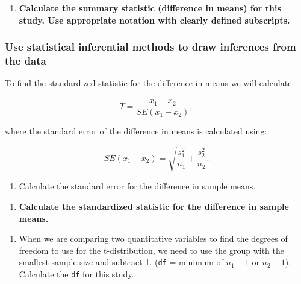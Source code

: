 \documentclass[
]{report}
\providecommand{\tightlist}{%
  \setlength{\itemsep}{0pt}\setlength{\parskip}{0pt}}
\begin{document}
\begin{enumerate}
\def\labelenumi{\arabic{enumi}.}
\setcounter{enumi}{5}
\tightlist
\item
  \textbf{Calculate the summary statistic (difference in means) for this study. Use appropriate notation with clearly defined subscripts.}
\end{enumerate}

\vspace{1in}

\hypertarget{use-statistical-inferential-methods-to-draw-inferences-from-the-data-4}{%
\subsubsection*{Use statistical inferential methods to draw inferences from the data}\label{use-statistical-inferential-methods-to-draw-inferences-from-the-data-4}}

To find the standardized statistic for the difference in means we will calculate:

\[T = \frac{\bar{x}_1-\bar{x}_2}{SE(\bar{x}_1-\bar{x}_2)},\]

where the standard error of the difference in means is calculated using:

\[SE(\bar{x}_1 -\bar{x}_2)=\sqrt{\frac{s_1^2}{n_1}+\frac{s_2^2}{n_2}}.\]

\begin{enumerate}
\def\labelenumi{\arabic{enumi}.}
\setcounter{enumi}{6}
\tightlist
\item
  Calculate the standard error for the difference in sample means.
\end{enumerate}

\vspace{0.5in}

\begin{enumerate}
\def\labelenumi{\arabic{enumi}.}
\setcounter{enumi}{7}
\tightlist
\item
  \textbf{Calculate the standardized statistic for the difference in sample means.}
\end{enumerate}

\vspace{0.5in}

\begin{enumerate}
\def\labelenumi{\arabic{enumi}.}
\setcounter{enumi}{8}
\tightlist
\item
  When we are comparing two quantitative variables to find the degrees of freedom to use for the t-distribution, we need to use the group with the smallest sample size and subtract 1. (\texttt{df} = minimum of \(n_1 - 1\) or \(n_2 - 1\)). Calculate the \texttt{df} for this study.
\end{enumerate}
\end{document}
